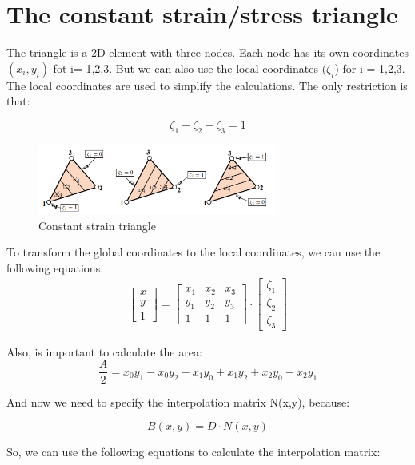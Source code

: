 \documentclass{article}  %
\begin{document}
\newpage
\section{The constant strain/stress triangle}
The triangle is a 2D element with three nodes. Each node has its own coordinates $(x_i,y_i)$ fot i= 1,2,3. But we can also use the local coordinates ($\zeta_i$) for i = 1,2,3. The local coordinates are used to simplify the calculations. The only restriction is that:

$$\zeta_1+\zeta_2+\zeta_3=1$$

\begin{figure}[h]
    \centering
    \includegraphics[width=0.7\textwidth]{Graphics/CST_1.PNG}
    \caption{Constant strain triangle}
    \label{fig:constant_strain_triangle}
\end{figure}

To transform the global coordinates to the local coordinates, we can use the following equations:
\begin{align}
  \begin{bmatrix}
    x \\
    y \\
    1
  \end{bmatrix}
  = 
  \begin{bmatrix}
    x_1 & x_2 & x_3 \\
    y_1 & y_2 & y_3 \\
    1   & 1   & 1
  \end{bmatrix}
  \cdot
  \begin{bmatrix}
    \zeta_1 \\
    \zeta_2 \\
    \zeta_3
  \end{bmatrix}
\end{align}

Also, is important to calculate the area:
$$\frac{A}{2}= x_0y_1 - x_0 y_2 - x_1y_0 +x_1y_2 +x_2y_0 - x_2y_1$$

And now we need to specify the interpolation matrix N(x,y), because: 

$$B(x,y)= D\cdot N(x,y)$$

So, we can use the following equations to calculate the interpolation matrix:
\end{document}

